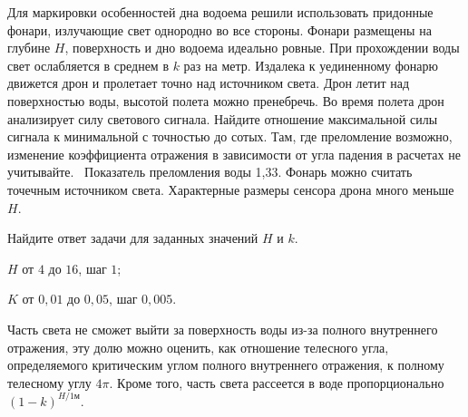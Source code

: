 
Для маркировки особенностей дна водоема решили
использовать придонные фонари,
излучающие свет однородно во все стороны. Фонари размещены на глубине $H$,
поверхность и дно водоема идеально ровные. При прохождении воды свет ослабляется в
среднем в $k$ раз на метр. Издалека к уединенному фонарю движется дрон и пролетает точно 
над источником света. Дрон летит над поверхностью воды, высотой полета можно пренебречь. 
Во время полета дрон анализирует силу светового сигнала. Найдите отношение максимальной силы сигнала к
минимальной с точностью до сотых. Там, где преломление возможно, изменение
коэффициента отражения в зависимости от угла падения в расчетах не учитывайте.
 Показатель преломления воды 1,33. Фонарь
можно считать точечным источником света. Характерные размеры сенсора дрона много меньше $H$.         

Найдите ответ задачи для заданных значений $H$ и $k$.

\paramSection

$H$ от $4$ до $16$, шаг $1$;

$K$ от $0,01$ до $0,05$, шаг $0,005$.

\soultionSection

Часть света не сможет выйти за поверхность воды из-за полного внутреннего отражения, эту долю можно оценить, 
как отношение телесного угла, определяемого критическим углом полного внутреннего отражения, к полному телесному углу $4\pi$.  
Кроме того, часть света рассеется в воде пропорционально $(1-k)^{H/1\text{м}}$.

